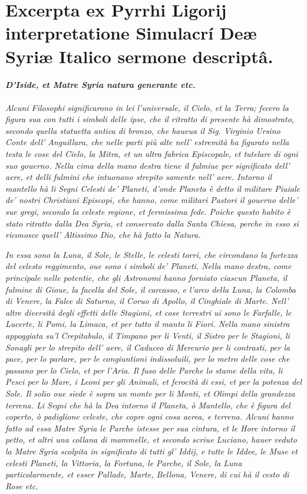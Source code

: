 \documentclass[a4paper, 11pt, oneside, polutonikogreek, latin]{article}
\begin{document}
\section{Excerpta ex Pyrrhi Ligorij interpretatione Simulacrí Deæ Syriæ Italico sermone descriptâ.}
\begin{center}
\textbf{\emph{D'Iside, et Matre Syria natura generante etc.}}
\end{center}
\paragraph{}
\emph{Alcuni Filosophi significarono in lei l'universale, il Cielo, et la Terra; fecero la figura sua con tutti i simboli delle ipse, che il ritratto di presente hà dimostrato, secondo quella statuetta antica di bronzo, che haueua il Sig. Virginio Ursino Conte dell' Anguillara, che nelle parti più alte nell' estremità ha figurato nella testa le cose del Cielo, la Mitra, et un altra fabrica Episcopale, et tutelare di ogni suo gouerno. Nella cima della mano destra tiene il fulmiue per significato dell' aere, et delli fulmini che intuonano strepito samente nell' aere. Intorno il mantello hà li Segni Celesti de' Planeti, d'onde Planeta è detto il militare Piuiale de' nostri Christiani Episcopi, che hanno, come militari Pastori il gouerno delle' sue gregi, secondo la celeste regione, et fermissima fede. Poiche questo habito è stato ritratto dalla Dea Syria, et conservato dalla Santa Chiesa, perche in esso si riconosce quell' Altissimo Dio, che hà fatto la Natura.}

\emph{In essa sono la Luna, il Sole, le Stelle, le celesti torri, che circondano la furtezza del celesto reggimento, oue sono i simboli de' Planeti. Nella mano destra, come principale nelle potentie, che gli Astronomi hanno forniato ciascun Planeta, il fulmine di Gioue, la facella del Sole, il carcasso, e l'arco della Luna, la Colomba di Venere, la Falce di Saturno, il Coruo di Apollo, il Cinghiale di Marte. Nell' altre diversità degli effetti delle Stagioni, et cose terrestri ui sono le Farfalle, le Lucerte, li Pomi, la Limaca, et per tutto il manto li Fiori. Nella mano sinistra appoggiata su'l Crepitabulo, il Timpano per li Venti, il Sistro per le Stagioni, li Sonagli per lo strepito dell' aere, il Caduceo di Mercurio per li contrasti, per la pace, per lo parlare, per le congiuntioni indissoluili, per lo metro delle cose che passano per lo Cielo, et per l'Aria. Il fuso delle Parche lo stame della vita, li Pesci per lo Mare, i Leoni per gli Animali, et ferocità di essi, et per la potenza del Sole. Il solio oue siede è sopra un monte per li Monti, et Olimpi della grandezza terrena. Li Segni che hà la Dea intorno il Planeta, ò Mantello, che è figura del coperto, ò padiglione celeste, che copre ogni cosa aerea, e terrena. Alcuni hanno fatto ad essa Matre Syria le Parche istesse per sua cintura, et le Hore intorno il petto, et altri una collana di mammelle, et secondo scriue Luciano, hauer veduto la Matre Syria scolpita in significato di tutti gl' Iddij, e tutte le Iddee, le Muse et celesti Planeti, la Vittoria, la Fortuna, le Parche, il Sole, la Luna particolarmente, et esser Pallade, Marte, Bellona, Venere, di cui hà il cesto di Rose etc.}
\end{document}
